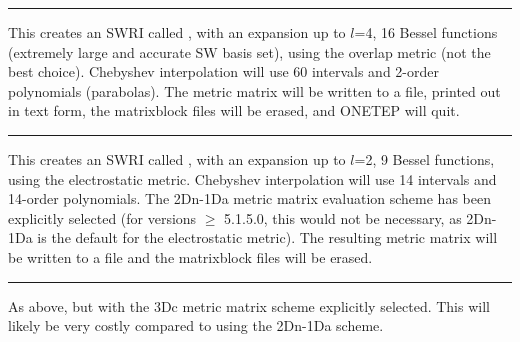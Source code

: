 \documentclass[letterpaper,10pt,english]{sphinxmanual}
\begin{document}
\bigskip\hrule\bigskip


This creates an SWRI called , with an expansion up to
\(l\)=4, 16 Bessel functions (extremely large and accurate SW
basis set), using the overlap metric (not the best choice). Chebyshev
interpolation will use 60 intervals and 2-order polynomials (parabolas).
The metric matrix will be written to a file, printed out in text form,
the matrixblock files will be erased, and ONETEP will quit.

%
\begin{sphinxVerbatim}[commandchars=\\\{\}]
 
        
 
\end{sphinxVerbatim}


\bigskip\hrule\bigskip


This creates an SWRI called , with an expansion up to
\(l\)=2, 9 Bessel functions, using the electrostatic metric.
Chebyshev interpolation will use 14 intervals and 14-order polynomials.
The 2Dn-1Da metric matrix evaluation scheme has been explicitly selected
(for versions \(\ge\) 5.1.5.0, this would not be necessary, as
2Dn-1Da is the default for the electrostatic metric). The resulting
metric matrix will be written to a file and the matrixblock files will
be erased.

%
\begin{sphinxVerbatim}[commandchars=\\\{\}]
 
        
 
\end{sphinxVerbatim}


\bigskip\hrule\bigskip


As above, but with the 3Dc metric matrix scheme explicitly selected.
This will likely be very costly compared to using the 2Dn-1Da scheme.

%
\begin{sphinxVerbatim}[commandchars=\\\{\}]
 
        
 
\end{sphinxVerbatim}
\end{document}

